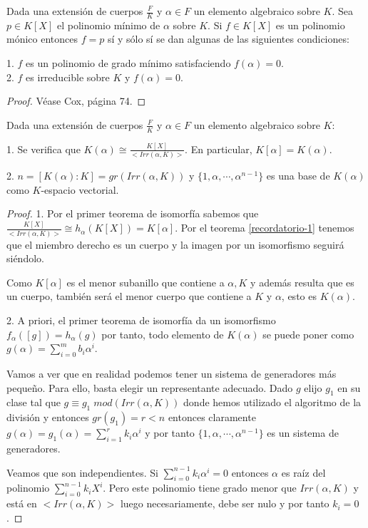 \begin{proposition}
Dada una extensión de cuerpos $\frac{F}{K}$ y $\alpha \in F$ un elemento algebraico sobre $K$. Sea $p \in K[X]$ el polinomio mínimo de $\alpha$ sobre $K$. Si $f \in K[X]$ es un polinomio mónico entonces $f = p$ sí y sólo sí se dan algunas de las siguientes condiciones:

1. $f$ es un polinomio de grado mínimo satisfaciendo $f(\alpha) = 0$.\\
2. $f$ es irreducible sobre $K$ y $f(\alpha) = 0$. 
\end{proposition}
\begin{proof}
	Véase Cox, página 74. 
\end{proof}

\begin{proposition}
	Dada una extensión de cuerpos $\frac{F}{K}$ y $\alpha \in F$ un elemento algebraico sobre $K$:
	
	1. Se verifica que $K(\alpha) \cong \frac{K[X]}{<Irr(\alpha,K)>}$. En particular, $K[\alpha] = K(\alpha)$. 
	
	2. $n = [K(\alpha):K] = gr(Irr(\alpha,K))$ y $\{1,\alpha,\cdots,\alpha^{n-1}\}$ es una base de $K(\alpha)$ como $K$-espacio vectorial.
\end{proposition}
\begin{proof}
	1. Por el primer teorema de isomorfía sabemos que $\frac{K[X]}{<Irr(\alpha,K)>} \cong h_\alpha(K[X]) = K[\alpha]$. Por el teorema \ref{recordatorio-1} tenemos que el miembro derecho es un cuerpo y la imagen por un isomorfismo seguirá siéndolo. 
	
	Como $K[\alpha]$ es el menor subanillo que contiene a $\alpha,K$ y además resulta que es un cuerpo, también será el menor cuerpo que contiene a $K$ y $\alpha$, esto es $K(\alpha)$. 
	
	2. A priori, el primer teorema de isomorfía da un isomorfismo $f_\alpha([g]) = h_\alpha(g)$ por tanto, todo elemento de $K(\alpha)$ se puede poner como $g(\alpha) = \sum_{i = 0}^m b_i \alpha^i$. 
	
	Vamos a ver que en realidad podemos tener un sistema de generadores más pequeño. Para ello, basta elegir un representante adecuado. Dado $g$ elijo $g_1$ en su clase tal que $g \equiv g_1 \; mod(Irr(\alpha,K))$ donde hemos utilizado el algoritmo de la división y entonces $gr(g_1) = r < n$ entonces claramente $g(\alpha) = g_1(\alpha) = \sum_{i = 1}^r k_i \alpha^i$ y por tanto $\{1, \alpha,\cdots,\alpha^{n-1}\}$ es un sistema de generadores. 
	
	Veamos que son independientes. Si $\sum_{i = 0}^{n-1} k_i \alpha^{i} = 0$ entonces $\alpha$ es raíz del polinomio $\sum_{i = 0}^{n-1} k_i X^{i}$. Pero este polinomio tiene grado menor que $Irr(\alpha,K)$ y está en $<Irr(\alpha,K)>$ luego necesariamente, debe ser nulo y por tanto $k_i = 0$. 
\end{proof}


